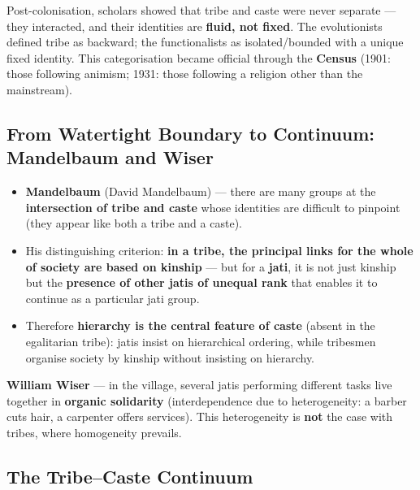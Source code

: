 Post-colonisation, scholars showed that tribe and caste were never separate --- they interacted, and their identities are \textbf{fluid, not fixed}. The evolutionists defined tribe as backward; the functionalists as isolated/bounded with a unique fixed identity. This categorisation became official through the \textbf{Census} (1901: those following animism; 1931: those following a religion other than the mainstream).

\subsection{From Watertight Boundary to Continuum: Mandelbaum and Wiser}

\begin{KeyConcept}
\begin{itemize}
\item \textbf{Mandelbaum} (David Mandelbaum) --- there are many groups at the \textbf{intersection of tribe and caste} whose identities are difficult to pinpoint (they appear like both a tribe and a caste).
\item His distinguishing criterion: \textbf{in a tribe, the principal links for the whole of society are based on kinship} --- but for a \textbf{jati}, it is not just kinship but the \textbf{presence of other jatis of unequal rank} that enables it to continue as a particular jati group.
\item Therefore \textbf{hierarchy is the central feature of caste} (absent in the egalitarian tribe): jatis insist on hierarchical ordering, while tribesmen organise society by kinship without insisting on hierarchy.
\end{itemize}
\end{KeyConcept}

\begin{ExampleBox}
\textbf{William Wiser} --- in the village, several jatis performing different tasks live together in \textbf{organic solidarity} (interdependence due to heterogeneity: a barber cuts hair, a carpenter offers services). This heterogeneity is \textbf{not} the case with tribes, where homogeneity prevails.
\end{ExampleBox}

\subsection{The Tribe--Caste Continuum}

